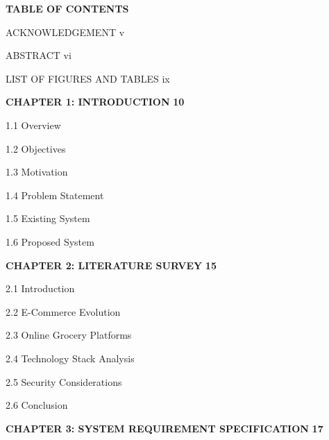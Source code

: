 \documentclass[12pt,a4paper]{report}
\begin{document}
\begin{center}
    \textbf{\Large TABLE OF CONTENTS}
\end{center}

\vspace{20pt}

\noindent ACKNOWLEDGEMENT \dotfill v

\noindent ABSTRACT \dotfill vi

\noindent LIST OF FIGURES AND TABLES \dotfill ix

\vspace{10pt}

\noindent \textbf{CHAPTER 1: INTRODUCTION} \dotfill \textbf{10}

\hspace{1.5em} 1.1 Overview 

\hspace{1.5em} 1.2 Objectives 

\hspace{1.5em} 1.3 Motivation 

\hspace{1.5em} 1.4 Problem Statement 

\hspace{1.5em} 1.5 Existing System 

\hspace{1.5em} 1.6 Proposed System 

\vspace{8pt}

\noindent \textbf{CHAPTER 2: LITERATURE SURVEY} \dotfill \textbf{15}

\hspace{1.5em} 2.1 Introduction 

\hspace{1.5em} 2.2 E-Commerce Evolution 

\hspace{1.5em} 2.3 Online Grocery Platforms 

\hspace{1.5em} 2.4 Technology Stack Analysis 

\hspace{1.5em} 2.5 Security Considerations 

\hspace{1.5em} 2.6 Conclusion 

\vspace{8pt}

\noindent \textbf{CHAPTER 3: SYSTEM REQUIREMENT SPECIFICATION} \dotfill \textbf{17}
\end{document}
